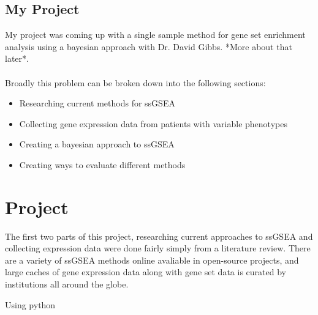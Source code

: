 \documentclass[a4paper,12pt]{article}
\begin{document}
\subsection{My Project}
My project was coming up with a single sample method for gene set enrichment analysis using a bayesian approach with Dr. David Gibbs. *More about that later*.
\\ \\
Broadly this problem can be broken down into the following sections:
\begin{itemize}
\item Researching current methods for ssGSEA 
\item Collecting gene expression data from patients with variable phenotypes
\item Creating a bayesian approach to ssGSEA
\item Creating ways to evaluate different methods
\end{itemize}

\section{Project}
The first two parts of this project, researching current approaches to ssGSEA and collecting expression data were done fairly simply from a literature review. There are a variety of ssGSEA methods online avaliable in open-source projects, and large caches of gene expression data along with gene set data is curated by institutions all around the globe.

Using python 
\end{document}
